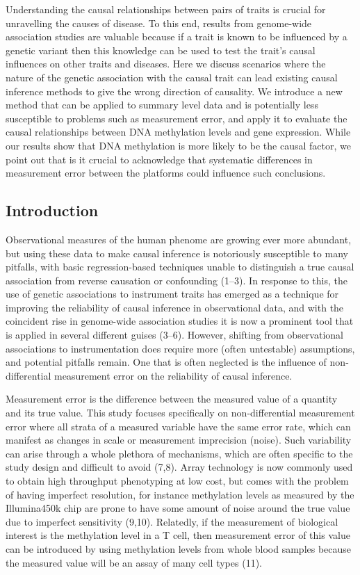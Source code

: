 \documentclass[]{article}
\begin{document}
Understanding the causal relationships between pairs of traits is
crucial for unravelling the causes of disease. To this end, results from
genome-wide association studies are valuable because if a trait is known
to be influenced by a genetic variant then this knowledge can be used to
test the trait's causal influences on other traits and diseases. Here we
discuss scenarios where the nature of the genetic association with the
causal trait can lead existing causal inference methods to give the
wrong direction of causality. We introduce a new method that can be
applied to summary level data and is potentially less susceptible to
problems such as measurement error, and apply it to evaluate the causal
relationships between DNA methylation levels and gene expression. While
our results show that DNA methylation is more likely to be the causal
factor, we point out that is it crucial to acknowledge that systematic
differences in measurement error between the platforms could influence
such conclusions.

\subsection{Introduction}\label{introduction}

Observational measures of the human phenome are growing ever more
abundant, but using these data to make causal inference is notoriously
susceptible to many pitfalls, with basic regression-based techniques
unable to distinguish a true causal association from reverse causation
or confounding (1--3). In response to this, the use of genetic
associations to instrument traits has emerged as a technique for
improving the reliability of causal inference in observational data, and
with the coincident rise in genome-wide association studies it is now a
prominent tool that is applied in several different guises (3--6).
However, shifting from observational associations to instrumentation
does require more (often untestable) assumptions, and potential pitfalls
remain. One that is often neglected is the influence of non-differential
measurement error on the reliability of causal inference.

Measurement error is the difference between the measured value of a
quantity and its true value. This study focuses specifically on
non-differential measurement error where all strata of a measured
variable have the same error rate, which can manifest as changes in
scale or measurement imprecision (noise). Such variability can arise
through a whole plethora of mechanisms, which are often specific to the
study design and difficult to avoid (7,8). Array technology is now
commonly used to obtain high throughput phenotyping at low cost, but
comes with the problem of having imperfect resolution, for instance
methylation levels as measured by the Illumina450k chip are prone to
have some amount of noise around the true value due to imperfect
sensitivity (9,10). Relatedly, if the measurement of biological interest
is the methylation level in a T cell, then measurement error of this
value can be introduced by using methylation levels from whole blood
samples because the measured value will be an assay of many cell types
(11).
\end{document}

